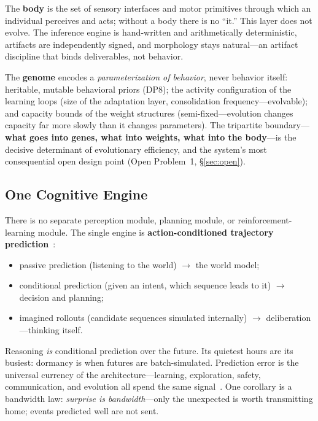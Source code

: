 \documentclass[11pt,a4paper]{article}
\begin{document}
The \textbf{body} is the set of sensory interfaces and motor primitives through which an individual perceives and acts; without a body there is no ``it.'' This layer does not evolve. The inference engine is hand-written and arithmetically deterministic, artifacts are independently signed, and morphology stays natural---an artifact discipline that binds deliverables, not behavior.

The \textbf{genome} encodes a \emph{parameterization of behavior}, never behavior itself: heritable, mutable behavioral priors (DP8); the activity configuration of the learning loops (size of the adaptation layer, consolidation frequency---evolvable); and capacity bounds of the weight structures (semi-fixed---evolution changes capacity far more slowly than it changes parameters). The tripartite boundary---\textbf{what goes into genes, what into weights, what into the body}---is the decisive determinant of evolutionary efficiency, and the system's most consequential open design point (Open Problem~1, \S\ref{sec:open}).

\subsection{One Cognitive Engine}
\label{sec:engine}

There is no separate perception module, planning module, or reinforcement-learning module. The single engine is \textbf{action-conditioned trajectory prediction}~\cite{ha2018worldmodels,hafner2020dream}:

\begin{itemize}[leftmargin=1.4em,itemsep=1pt]
  \item passive prediction (listening to the world) $\to$ the world model;
  \item conditional prediction (given an intent, which sequence leads to it) $\to$ decision and planning;
  \item imagined rollouts (candidate sequences simulated internally) $\to$ deliberation---thinking itself.
\end{itemize}

Reasoning \emph{is} conditional prediction over the future. Its quietest hours are its busiest: dormancy is when futures are batch-simulated. Prediction error is the universal currency of the architecture---learning, exploration, safety, communication, and evolution all spend the same signal~\cite{friston2010freeenergy,clark2013predictive}. One corollary is a bandwidth law: \emph{surprise is bandwidth}---only the unexpected is worth transmitting home; events predicted well are not sent.
\end{document}
